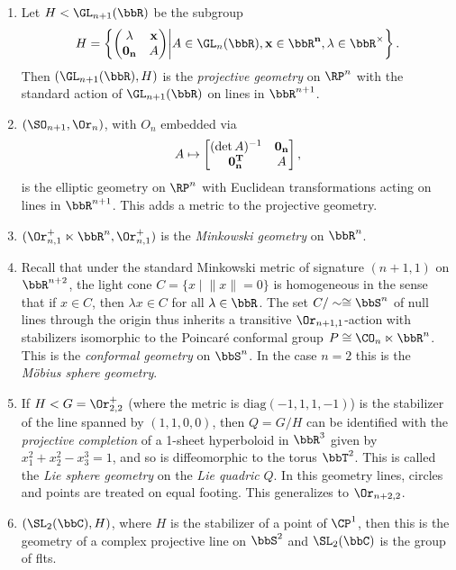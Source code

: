 \begin{example}
\begin{enumerate}
        \item Let $H<\GL_{n+1}(\bbR)$ be the subgroup
        \[H=\left\{\begin{pmatrix}
            \lambda& \bf{x}\\ \bf{0}_n &A
        \end{pmatrix}
        \middle| A\in\GL_n(\bbR),\bf{x}\in\bbR^n,\lambda\in \bbR^\times \right\}.\]
        Then $(\GL_{n+1}(\bbR),H)$ is the \emph{projective geometry} on $\RP^n$ with the standard action of $\GL_{n+1}(\bbR)$ on lines in $\bbR^{n+1}$.
        
        \item $(\SO_{n+1},\Or_n)$, with $O_n$ embedded via
        \[A\mapsto \begin{bmatrix}
            (\det A)^{-1}&\bf{0}_n\\\bf{0}_n^T &  A
        \end{bmatrix},\]
        is the elliptic geometry on $\RP^n$ with Euclidean transformations acting on lines in $\bbR^{n+1}$. This adds a metric to the projective geometry.

        \item $(\Or_{n,1}^+\ltimes\bbR^n,\Or_{n,1}^+)$ is the \emph{Minkowski geometry} on $\bbR^n$.

        \item Recall that under the standard Minkowski metric of signature $(n+1,1)$ on $\bbR^{n+2}$, the light cone $C=\{x\mid \lVert x\rVert=0\}$ is homogeneous in the sense that if $x\in C$, then $\lambda x\in C$ for all $\lambda\in\bbR$. The set $C\slash \sim\cong\bbS^n$ of null lines through the origin thus inherits a transitive $\Or_{n+1,1}$-action with stabilizers isomorphic to the Poincar\'e conformal group $P\cong \CO_n\ltimes \bbR^n$. This is the \emph{conformal geometry} on $\bbS^n$. In the case $n=2$ this is the \emph{M\"obius sphere geometry}.

        \item If $H<G=\Or_{2,2}^+$ (where the metric is $\mathrm{diag}(-1,1,1,-1)$) is the stabilizer of the line spanned by $(1,1,0,0)$, then $Q=G\slash H$ can be identified with the \emph{projective completion} of a 1-sheet hyperboloid in $\bbR^3$ given by $x_1^2+x_2^2-x_3^3=1$, and so is diffeomorphic to the torus $\bbT^2$. This is called the \emph{Lie sphere geometry} on the \emph{Lie quadric} $Q$. In this geometry lines, circles and points are treated on equal footing. This generalizes to $\Or_{n+2,2}$.

        \item $(\SL_2(\bbC),H)$, where $H$ is the stabilizer of a point of $\CP^1$, then this is the geometry of a complex projective line on $\bbS^2$ and $\SL_2(\bbC)$ is the group of \glspl{flt}.
    \end{enumerate}
\end{example}









